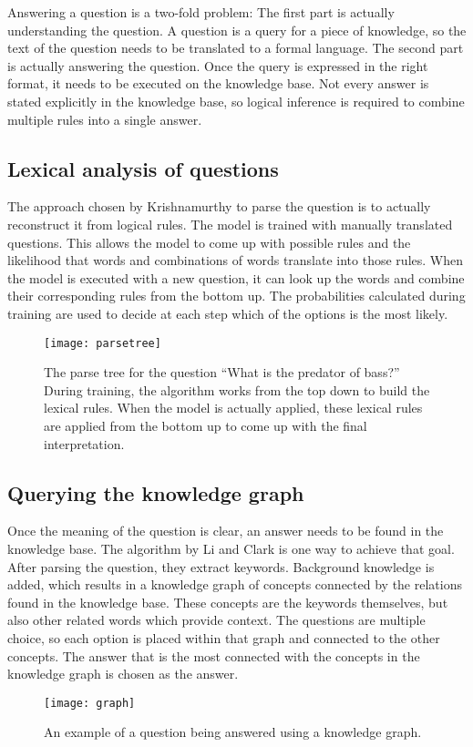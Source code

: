 Answering a question is a two-fold problem: The first part is actually understanding the question. A question is a query for a piece of knowledge, so the text of the question needs to be translated to a formal language. The second part is actually answering the question. Once the query is expressed in the right format, it needs to be executed on the knowledge base. Not every answer is stated explicitly in the knowledge base, so logical inference is required to combine multiple rules into a single answer. 
\subsection{Lexical analysis of questions}
The approach chosen by Krishnamurthy \cite{probseman} to parse the question is to actually reconstruct it from logical rules. The model is trained with manually translated questions. This allows the model to come up with possible rules and the likelihood that words and combinations of words translate into those rules. When the model is executed with a new question, it can look up the words and combine their corresponding rules from the bottom up. The probabilities calculated during training are used to decide at each step which of the options is the most likely.
\begin{figure}
\texttt{[image: parsetree]}
\caption{The parse tree for the question ``What is the predator of bass?'' During training, the algorithm works from the top down to build the lexical rules. When the model is actually applied, these lexical rules are applied from the bottom up to come up with the final interpretation.}\label{fig:parsetree}
\end{figure}

\subsection{Querying the knowledge graph}
Once the meaning of the question is clear, an answer needs to be found in the knowledge base. The algorithm by Li and Clark \cite{sciencequestions} is one way to achieve that goal. After parsing the question, they extract keywords. Background knowledge is added, which results in a knowledge graph of concepts connected by the relations found in the knowledge base. These concepts are the keywords themselves, but also other related words which provide context. The questions are multiple choice, so each option is placed within that graph and connected to the other concepts. The answer that is the most connected with the concepts in the knowledge graph is chosen as the answer.

\begin{figure}
\texttt{[image: graph]}
\caption{An example of a question being answered using a knowledge graph.}\label{fig:parsetree}
\end{figure}